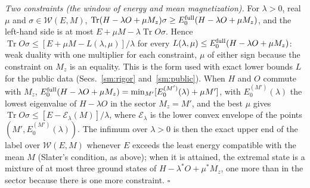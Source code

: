 \documentclass[aps,prx,onecolumn,10pt,nofootinbib,longbibliography,floatfix]{revtex4-2}
\theoremstyle{remark}
\newcommand{\W}{\mathcal{W}}
\newcommand{\Tr}{\operatorname{Tr}}
\begin{document}
\emph{Two constraints (the window of energy and mean magnetization).} For $\lambda>0$, real $\mu$ and
$\sigma\in\W(E,M)$, $\Tr(H-\lambda O+\mu M_z)\sigma\ge E_0^{\rm full}(H-\lambda O+\mu M_z)$, and the left-hand side
is at most $E+\mu M-\lambda\Tr O\sigma$. Hence $\Tr O\sigma\le[E+\mu M-L(\lambda,\mu)]/\lambda$ for every
$L(\lambda,\mu)\le E_0^{\rm full}(H-\lambda O+\mu M_z)$: weak duality with one multiplier for each constraint, $\mu$
of either sign because the constraint on $M_z$ is an equality. This is the form used with exact lower bounds $L$ for
the public data (Secs.~\ref{sm:rigor} and~\ref{sm:public}). When $H$ and $O$ commute with $M_z$,
$E_0^{\rm full}(H-\lambda O+\mu M_z)=\min_{M'}[E_0^{(M')}(\lambda)+\mu M']$, with $E_0^{(M')}(\lambda)$ the lowest
eigenvalue of $H-\lambda O$ in the sector $M_z=M'$, and the best $\mu$ gives
$\Tr O\sigma\le[E-\mathcal E_\lambda(M)]/\lambda$, where $\mathcal E_\lambda$ is the lower convex envelope of the
points $(M',E_0^{(M')}(\lambda))$. The infimum over $\lambda>0$ is then the exact upper end of the label over
$\W(E,M)$ whenever $E$ exceeds the least energy compatible with the mean $M$ (Slater's condition, as above); when
it is attained, the extremal state is a mixture of at most three ground states of $H-\lambda^*O+\mu^*M_z$, one more
than in the sector because there is one more constraint. \hfill$\square$
\end{document}
